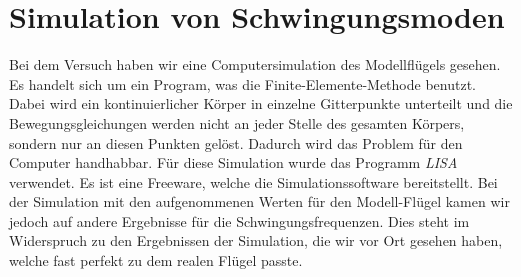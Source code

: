 \documentclass[12pt,a4paper,titlepage,headinclude,bibtotoc]{scrartcl}
\begin{document}
\section{Simulation von Schwingungsmoden}
Bei dem Versuch haben wir eine Computersimulation des Modellflügels gesehen.
Es handelt sich um ein Program, was die Finite-Elemente-Methode benutzt.
Dabei wird ein kontinuierlicher Körper in einzelne Gitterpunkte unterteilt und die Bewegungsgleichungen werden nicht an jeder Stelle des gesamten Körpers, sondern nur an diesen Punkten gelöst.
Dadurch wird das Problem für den Computer handhabbar.
Für diese Simulation wurde das Programm \textit{LISA} verwendet.
Es ist eine Freeware, welche die Simulationssoftware bereitstellt.
Bei der Simulation mit den aufgenommenen Werten für den Modell-Flügel kamen wir jedoch auf andere Ergebnisse für die Schwingungsfrequenzen.
Dies steht im Widerspruch zu den Ergebnissen der Simulation, die wir vor Ort gesehen haben, welche fast perfekt zu dem realen Flügel passte.
\end{document}
